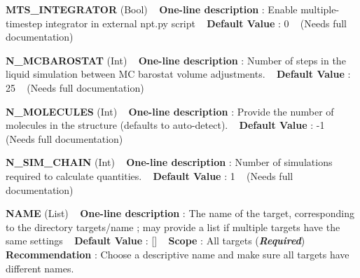 \begin{DoxyItemize}
\item {\bfseries  M\+T\+S\+\_\+\+I\+N\+T\+E\+G\+R\+A\+T\+OR } (Bool) ~\newline
{\bfseries  One-\/line description }\+: Enable multiple-\/timestep integrator in external npt.\+py script ~\newline
{\bfseries  Default Value }\+: 0 ~\newline
(Needs full documentation)\end{DoxyItemize}
\begin{DoxyItemize}
\item {\bfseries  N\+\_\+\+M\+C\+B\+A\+R\+O\+S\+T\+AT } (Int) ~\newline
{\bfseries  One-\/line description }\+: Number of steps in the liquid simulation between MC barostat volume adjustments. ~\newline
{\bfseries  Default Value }\+: 25 ~\newline
(Needs full documentation)\end{DoxyItemize}
\begin{DoxyItemize}
\item {\bfseries  N\+\_\+\+M\+O\+L\+E\+C\+U\+L\+ES } (Int) ~\newline
{\bfseries  One-\/line description }\+: Provide the number of molecules in the structure (defaults to auto-\/detect). ~\newline
{\bfseries  Default Value }\+: -\/1 ~\newline
(Needs full documentation)\end{DoxyItemize}
\begin{DoxyItemize}
\item {\bfseries  N\+\_\+\+S\+I\+M\+\_\+\+C\+H\+A\+IN } (Int) ~\newline
{\bfseries  One-\/line description }\+: Number of simulations required to calculate quantities. ~\newline
{\bfseries  Default Value }\+: 1 ~\newline
(Needs full documentation)\end{DoxyItemize}
\begin{DoxyItemize}
\item {\bfseries  N\+A\+ME } (List) ~\newline
{\bfseries  One-\/line description }\+: The name of the target, corresponding to the directory targets/name ; may provide a list if multiple targets have the same settings ~\newline
{\bfseries  Default Value }\+: \mbox{[}\mbox{]} ~\newline
{\bfseries  Scope }\+: All targets ({\bfseries {\itshape Required}}) ~\newline
{\bfseries  Recommendation }\+: Choose a descriptive name and make sure all targets have different names.\end{DoxyItemize}
